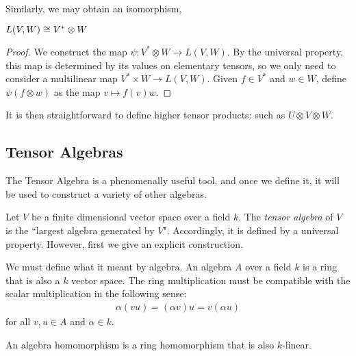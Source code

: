 Similarly, we may obtain an isomorphism,
\begin{proposition}
    $L(V,W) \cong V^* \otimes W$
\end{proposition}
\begin{proof}
    We construct the map $\psi: V^* \otimes W \rightarrow L(V,W)$. By the universal
    property, this map is determined by its values on elementary tensors,
    so we only need to consider a multilinear map $V^*\times W \rightarrow L(V,W)$.
    Given $f \in V^*$ and $w \in W$, define $\psi(f\otimes w)$ as the map
    $v\mapsto f(v)w$.
\end{proof} 

It is then straightforward to define higher tensor products: such as $U \otimes V \otimes W$.

\subsection{Tensor Algebras}
The Tensor Algebra is a phenomenally useful tool, and once we define it, it
will be used to construct a variety of other algebras.

Let $V$ be a finite dimensional vector space over a field $k$. The
\emph{tensor algebra} of $V$ is the ``largest algebra generated by $V$".
Accordingly, it is defined by a universal property. However, first we
give an explicit construction.

We must define what it meant by algebra. An algebra $A$ over a field
$k$ is a ring that is also a $k$ vector space. The ring multiplication
must be compatible with the scalar multiplication in the following sense: 
\begin{align*}
    \alpha(vu) = (\alpha v)u = v(\alpha u)
\end{align*}
for all $v,u \in A$ and $\alpha \in k$. 

An algebra homomorphism is a ring homomorphism that is also $k$-linear.

